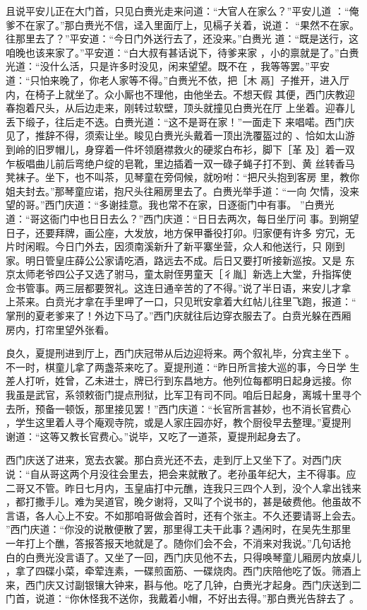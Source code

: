 且说平安儿正在大门首，只见白赉光走来问道：“大官人在家么？”平安儿道
：“俺爹不在家了。”那白赉光不信，迳入里面厅上，见槅子关着，说道：
“果然不在家。往那里去了？”平安道：“今日门外送行去了，还没来。”白赉光
道：“既是送行，这咱晚也该来家了。”平安道：“白大叔有甚话说下，待爹来家
，小的禀就是了。”白赉光道：“没什么活，只是许多时没见，闲来望望。既不在
，我等等罢。”平安道：“只怕来晚了，你老人家等不得。”白赉光不依，把［木
鬲］子推开，进入厅内，在椅子上就坐了。众小厮也不理他，由他坐去。不想天假
其便，西门庆教迎春抱着尺头，从后边走来，刚转过软壁，顶头就撞见白赉光在厅
上坐着。迎春儿丢下缎子，往后走不迭。白赉光道：“这不是哥在家！”一面走下
来唱喏。西门庆见了，推辞不得，须索让坐。睃见白赉光头戴着一顶出洗覆盔过的
、恰如太山游到岭的旧罗帽儿，身穿着一件坏领磨襟救火的硬浆白布衫，脚下［革
及］着一双乍板唱曲儿前后弯绝户绽的皂靴，里边插着一双一碌子蝇子打不到、黄
丝转香马凳袜子。坐下，也不叫茶，见琴童在旁伺候，就吩咐：“把尺头抱到客房
里，教你姐夫封去。”那琴童应诺，抱尺头往厢房里去了。白赉光举手道：“一向
欠情，没来望的哥。”西门庆道：“多谢挂意。我也常不在家，日逐衙门中有事。
”白赉光道：“哥这衙门中也日日去么？”西门庆道：“日日去两次，每日坐厅问
事。到朔望日子，还要拜牌，画公座，大发放，地方保甲番役打卯。归家便有许多
穷冗，无片时闲暇。今日门外去，因须南溪新升了新平寨坐营，众人和他送行，只
刚到家。明日管皇庄薛公公家请吃酒，路远去不成。后日又要打听接新巡按。又是
东京太师老爷四公子又选了驸马，童太尉侄男童天［彳胤］新选上大堂，升指挥使
佥书管事。两三层都要贺礼。这连日通辛苦的了不得。”说了半日语，来安儿才拿
上茶来。白贲光才拿在手里呷了一口，只见玳安拿着大红帖儿往里飞跑，报道：“
掌刑的夏老爹来了！外边下马了。”西门庆就往后边穿衣服去了。白贲光躲在西厢
房内，打帘里望外张看。

良久，夏提刑进到厅上，西门庆冠带从后边迎将来。两个叙礼毕，分宾主坐下
。不一时，棋童儿拿了两盏茶来吃了。夏提刑道：“昨日所言接大巡的事，今日学
生差人打听，姓曾，乙未进士，牌已行到东昌地方。他列位每都明日起身远接。你
我虽是武官，系领敕衙门提点刑狱，比军卫有司不同。咱后日起身，离城十里寻个
去所，预备一顿饭，那里接见罢！”西门庆道：“长官所言甚妙，也不消长官费心
，学生这里着人寻个庵观寺院，或是人家庄园亦好，教个厨役早去整理。”夏提刑
谢道：“这等又教长官费心。”说毕，又吃了一道茶，夏提刑起身去了。

西门庆送了进来，宽去衣裳。那白贲光还不去，走到厅上又坐下了。对西门庆
说：“自从哥这两个月没往会里去，把会来就散了。老孙虽年纪大，主不得事。应
二哥又不管。昨日七月内，玉皇庙打中元醮，连我只三四个人到，没个人拿出钱来
，都打撒手儿。难为吴道官，晚夕谢将，又叫了个说书的，甚是破费他。他虽故不
言语，各人心上不安。不如那咱哥做会首时，还有个张主。不久还要请哥上会去。
”西门庆道：“你没的说散便散了罢，那里得工夫干此事？遇闲时，在吴先生那里
一年打上个醮，答报答报天地就是了。随你们会不会，不消来对我说。”几句话抢
白的白赉光没言语了。又坐了一回，西门庆见他不去，只得唤琴童儿厢房内放桌儿
，拿了四碟小菜，牵荤连素，一碟煎面筋、一碟烧肉。西门庆陪他吃了饭。筛酒上
来，西门庆又讨副银镶大钟来，斟与他。吃了几钟，白赉光才起身。西门庆送到二
门首，说道：“你休怪我不送你，我戴着小帽，不好出去得。”那白赉光告辞去了
。

